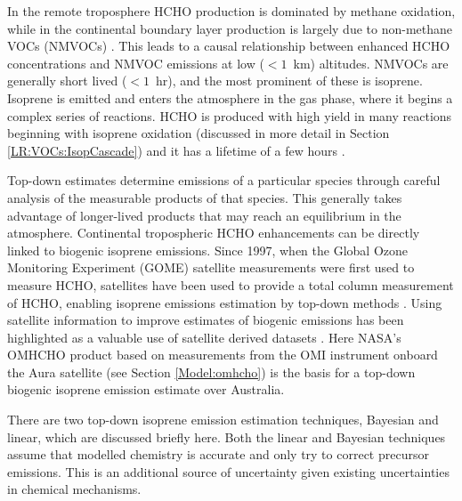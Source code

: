     In the remote troposphere HCHO production is dominated by methane oxidation, while in the continental boundary layer production is largely due to non-methane VOCs (NMVOCs) \parencite{Abbot2003, Kefauver2014}.
    This leads to a causal relationship between enhanced HCHO concentrations and NMVOC emissions at low ($<1$~km) altitudes.
    NMVOCs are generally short lived ($<1$~hr), and the most prominent of these is isoprene.
    Isoprene is emitted and enters the atmosphere in the gas phase, where it begins a complex series of reactions.
    HCHO is produced with high yield in many reactions beginning with isoprene oxidation (discussed in more detail in Section \ref{LR:VOCs:IsopCascade}) and it has a lifetime of a few hours \parencite{Kefauver2014}.
    
    Top-down estimates determine emissions of a particular species through careful analysis of the measurable products of that species.
    This generally takes advantage of longer-lived products that may reach an equilibrium in the atmosphere.
    Continental tropospheric HCHO enhancements can be directly linked to biogenic isoprene emissions.
    Since 1997, when the Global Ozone Monitoring Experiment (GOME) satellite measurements were first used to measure HCHO, satellites have been used to provide a total column measurement of HCHO, enabling isoprene emissions estimation by top-down methods \parencite{Thomas1998,Palmer2001,Bauwens2016}.
    Using satellite information to improve estimates of biogenic emissions has been highlighted as a valuable use of satellite derived datasets \parencite{Streets2013}.
    Here NASA's OMHCHO product based on measurements from the OMI instrument onboard the Aura satellite (see Section \ref{Model:omhcho}) is the basis for a top-down biogenic isoprene emission estimate over Australia.
    
    There are two top-down isoprene emission estimation techniques, Bayesian and linear, which are discussed briefly here.
    Both the linear and Bayesian techniques assume that modelled chemistry is accurate and only try to correct precursor emissions.
    This is an additional source of uncertainty given existing uncertainties in chemical mechanisms.
    
